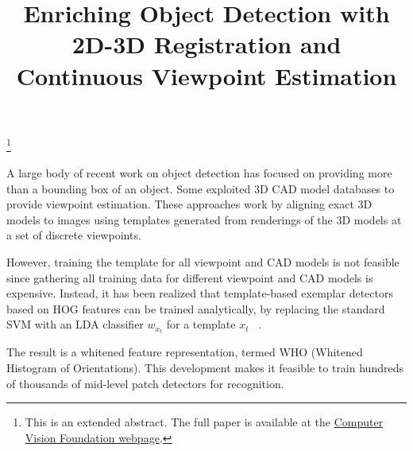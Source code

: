 \documentclass[extendedabs]{bmvc2k}
\begin{document}
\title{Enriching Object Detection with 2D-3D Registration and Continuous Viewpoint Estimation}


\maketitle
\let\thefootnote\relax\footnote{This is an extended abstract. The full paper is available at the \href{http://www.cv-foundation.org/openaccess/CVPR2015.py}{Computer Vision Foundation webpage}. }
\vspace{-0.2in}



\noindent

A large body of recent work on object detection has focused on providing more
than a bounding box of an object. Some exploited 3D CAD
model databases to provide viewpoint estimation. These approaches work
by aligning exact 3D models to images using templates generated from renderings
of the 3D models at a set of discrete viewpoints.

However, training the template for all viewpoint and CAD models is not feasible
since gathering all training data for different viewpoint and CAD models is
expensive.  Instead, it has been realized that template-based exemplar
detectors based on HOG features can be trained analytically, by
replacing the standard SVM with an LDA classifier $w_{x_t}$ for a template $x_t$
~\cite{Hariharan12}.

The result is a whitened feature representation, termed WHO (Whitened Histogram
of Orientations). This development makes it feasible to train hundreds of
thousands of mid-level patch detectors for recognition.
\end{document}

